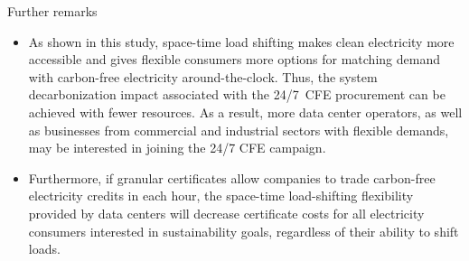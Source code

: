 \begin{frame}{Further remarks}
\label{ssec:remarks}

  {\footnotesize 

  \begin{itemize}

  \item As shown in this study, space-time load shifting makes clean electricity more accessible and gives flexible consumers more options for matching demand with carbon-free electricity around-the-clock. Thus, the system decarbonization impact associated with the 24/7~CFE procurement can be achieved with fewer resources. As a result, more data center operators, as well as businesses from commercial and industrial sectors with flexible demands, may be interested in \alert{joining the 24/7 CFE campaign}. 
  
  \item Furthermore, if granular certificates allow companies to trade carbon-free electricity credits in each hour, the space-time load-shifting flexibility provided by data centers will decrease certificate costs for \alert{all electricity consumers} interested in sustainability goals, \alert{regardless of their ability to shift loads}.
  \end{itemize}

  }

\end{frame}




    

